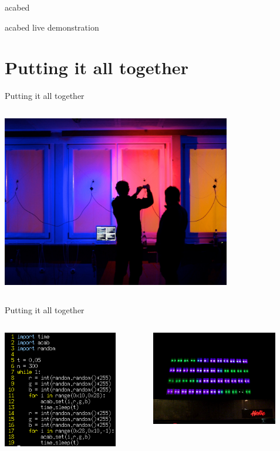 \documentclass{beamer}
\begin{document}
\begin{frame}{acabed}

    acabed live demonstration

\end{frame}

\section{Putting it all together}

\begin{frame}{Putting it all together}
  \begin{columns}
    \begin{column}{10cm}
      \includegraphics[width=10cm]{bilder/tests.jpg}
    \end{column}
  \end{columns}
\end{frame}

\begin{frame}{Putting it all together}
  \begin{columns}
    \begin{column}{5cm}
      \includegraphics[width=5cm]{bilder/fill.png}
    \end{column}
    \begin{column}{5cm}
      \includegraphics[width=5.5cm]{bilder/fail.png}
    \end{column}
  \end{columns}
\end{frame}
\end{document}
